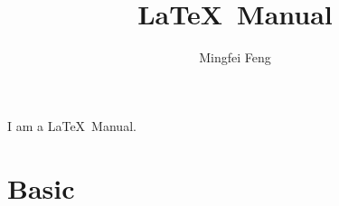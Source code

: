 \documentclass[12pt]{article}
\title{\LaTeX \ Manual}
\author{Mingfei Feng}%
\begin{document}
\maketitle
I am a \LaTeX \ Manual.
\section{Basic}
\end{document}

